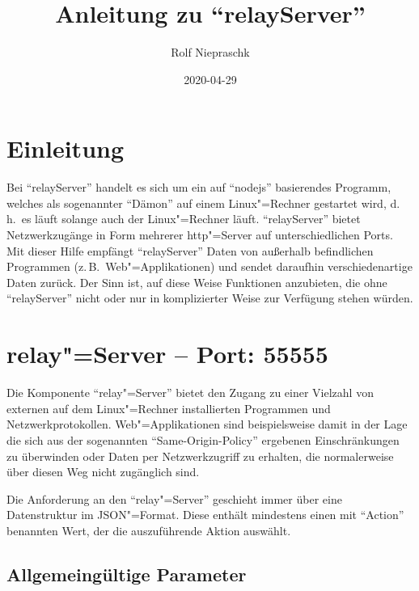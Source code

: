 \documentclass[titlepage=false,toc=nobibliography]{vl-report}
\newcommand*\theServer{relayServer}
\begin{document}
\subject{PTB~--~AG~7.54}
\title{Anleitung zu "`\theServer"'}
\date{2020-04-29}
\author{Rolf Niepraschk}

\maketitle

\section*{Einleitung}

Bei "`\theServer"' handelt es sich um ein auf "`nodejs"' basierendes
Programm, welches als sogenannter "`Dämon"' auf einem Linux"=Rechner
gestartet wird, d.\,h.\ es läuft solange auch der Linux"=Rechner läuft.
"`\theServer"' bietet Netzwerkzugänge in Form mehrerer
http"=Server auf unterschiedlichen Ports. Mit dieser Hilfe empfängt
"`\theServer"' Daten von außerhalb befindlichen Programmen (z.\,B.\
Web"=Applikationen) und sendet daraufhin verschiedenartige Daten zurück. Der
Sinn ist, auf diese Weise Funktionen anzubieten, die ohne "`\theServer"'
nicht oder nur in komplizierter Weise zur Verfügung stehen würden.

\section{relay"=Server -- Port: 55555}

Die Komponente "`relay"=Server"' bietet den Zugang zu einer Vielzahl von
externen auf dem Linux"=Rechner installierten Programmen und
Netzwerkprotokollen. Web"=Applikationen sind beispielsweise damit in der Lage
die sich aus der sogenannten "`Same-Origin-Policy"' ergebenen
Einschränkungen zu überwinden oder Daten per Netzwerkzugriff zu erhalten,
die normalerweise über diesen Weg nicht zugänglich sind.

Die Anforderung an den "`relay"=Server"' geschieht immer über eine
Datenstruktur im JSON"=Format. Diese enthält mindestens einen mit "`Action"'
benannten Wert, der die auszuführende Aktion auswählt.

\subsection{Allgemeingültige Parameter}
\end{document}
